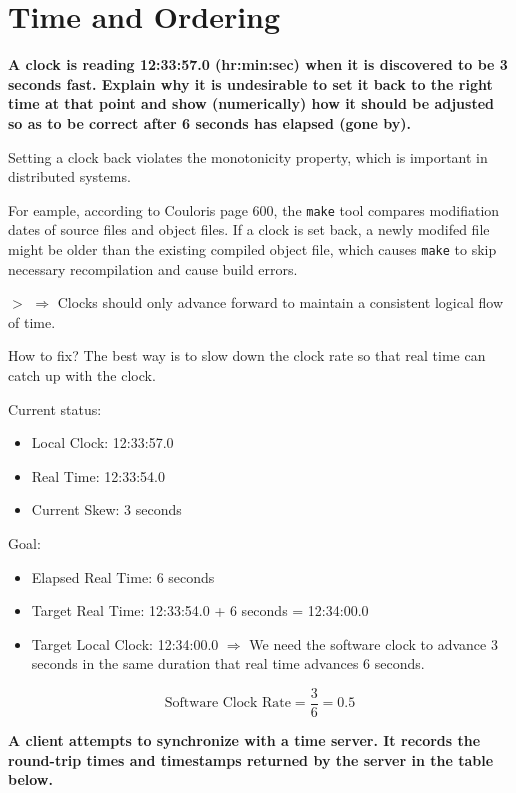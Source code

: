 \documentclass[12pt,a4paper]{article}
\newcommand{\remark}[1]{
    $>$ {\color{blue} #1}
}
\begin{document}
\section*{Time and Ordering}

\textbf{A clock is reading 12:33:57.0 (hr:min:sec) when it is discovered to be 3 seconds fast. Explain why it is undesirable to set it back to the right time at that point and show (numerically) how it should be adjusted so as to be correct after 6 seconds has elapsed (gone by).}

Setting a clock back violates the monotonicity property, which is important in distributed systems.

For eample, according to Couloris page 600, the \texttt{make} tool compares modifiation dates of source files and object files. 
If a clock is set back, a newly modifed file might be older than the existing compiled object file, 
which causes \texttt{make} to skip necessary recompilation and cause build errors.

\remark{$\Rightarrow$ Clocks should only advance forward to maintain a consistent logical flow of time.}

How to fix? The best way is to slow down the clock rate so that real time can catch up with the clock.

Current status:

\begin{itemize}
    \item Local Clock: 12:33:57.0
    \item Real Time: 12:33:54.0
    \item Current Skew: 3 seconds
\end{itemize}

Goal: 

\begin{itemize}
    \item Elapsed Real Time: 6 seconds
    \item Target Real Time: 12:33:54.0 + 6 seconds = 12:34:00.0
    \item Target Local Clock: 12:34:00.0 $\Rightarrow$ We need the software clock to advance 3 seconds in the same duration that real time advances 6 seconds.
\end{itemize}

\[\text{Software Clock Rate} = \frac{3}{6} = 0.5\]

\textbf{A client attempts to synchronize with a time server. It records the round-trip times and timestamps returned by the server in the table below.}
\end{document}
